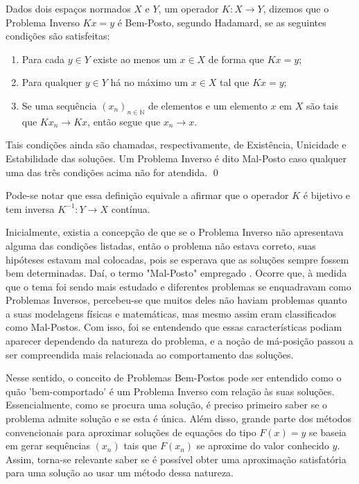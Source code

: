 \begin{defin}\label{def:problema-bem-posto}
Dados dois espaços normados $X$ e $Y$, um operador $K:X\to Y$, dizemos que o Problema Inverso $Kx = y$ é Bem-Posto, segundo Hadamard, se as seguintes condições são satisfeitas:
\begin{enumerate}
    \item Para cada $y \in Y$ existe ao menos um $x \in X$ de forma que $Kx = y$;
    \item Para qualquer $y\in Y$ há no máximo um $x\in X$ tal que $Kx = y$;
    \item Se uma sequência $(x_n)_{n \in \mathbb N}$ de elementos e um elemento $x$ em $X$ são tais que $Kx_n \to Kx$, então segue que $x_n\to x$.
\end{enumerate}

Tais condições ainda são chamadas, respectivamente, de Existência, Unicidade e Estabilidade das soluções. Um Problema Inverso é dito Mal-Posto caso qualquer uma das três condições acima não for atendida. \qed
    
\end{defin}

\begin{obs}
Pode-se notar que essa definição equivale a afirmar que o operador $K$ é bijetivo e tem inversa $K^{-1}:Y \to X$ contínua.
\end{obs}

Inicialmente, existia a concepção de que se o Problema Inverso não apresentava alguma das condições listadas, então o problema não estava correto, suas hipóteses estavam mal colocadas, pois se esperava que as soluções sempre fossem bem determinadas. Daí, o termo "Mal-Posto" empregado \cite{?}. Ocorre que, à medida que o tema foi sendo mais estudado e diferentes problemas se enquadravam como Problemas Inversos, percebeu-se que muitos deles não haviam problemas quanto a suas modelagens físicas e matemáticas, mas mesmo assim eram classificados como Mal-Postos. Com isso, foi se entendendo que essas características podiam aparecer dependendo da natureza do problema, e a noção de má-posição passou a ser compreendida mais relacionada ao comportamento das soluções.

Nesse sentido, o conceito de Problemas Bem-Postos pode ser entendido como o quão 'bem-comportado' é um Problema Inverso com relação às suas soluções. Essencialmente, como se procura uma solução, é preciso primeiro saber se o problema admite solução e se esta é única. Além disso, grande parte dos métodos convencionais para aproximar soluções de equações do tipo $F(x)=y$ se baseia em gerar sequências $(x_n)$ tais que $F(x_n)$ se aproxime do valor conhecido $y$. Assim, torna-se relevante saber se é possível obter uma aproximação satisfatória para uma solução ao usar um método dessa natureza.


